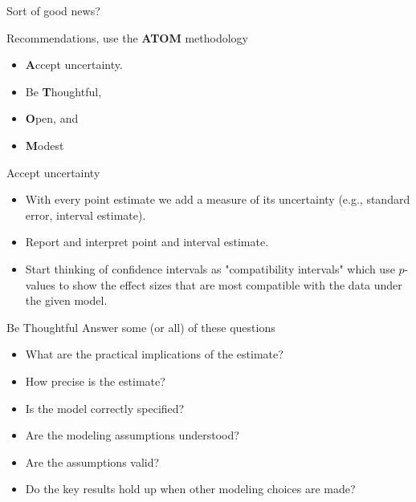 \documentclass{beamer}
\begin{document}
\begin{frame}{Sort of good news?}

Recommendations, use the \textbf{ATOM} methodology

\begin{itemize}
	\item  \textbf{A}ccept uncertainty. 
	\item Be \textbf{T}houghtful, 
	\item  \textbf{O}pen, and 
	\item \textbf{M}odest
\end{itemize}


\end{frame}

\begin{frame}{Accept uncertainty}
\begin{itemize}
	\item With every point estimate we add a measure of its uncertainty (e.g., standard error, interval estimate).
	\item Report and interpret point and interval estimate. 
	\item  Start thinking of confidence intervals as "compatibility intervals" which use $p$-values to show the effect sizes that are most compatible with the data under the given model.
\end{itemize}

\end{frame}

\begin{frame}{Be Thoughtful}
Answer some (or all) of these questions
\begin{itemize}
	\item What are the practical implications of the estimate?
	\item How precise is the estimate?
	\item Is the model correctly specified?
	\item Are the modeling assumptions understood?
	\item Are the assumptions valid?
	\item Do the key results hold up when other modeling choices are made?
\end{itemize}

\end{frame}
\end{document}
